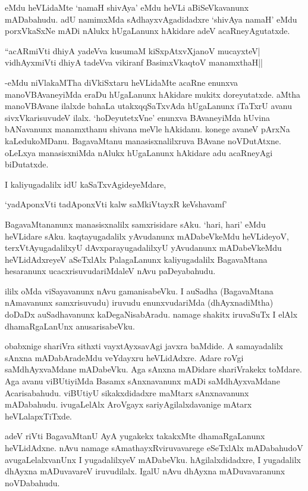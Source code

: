 eMdu heVLidaMte `namaH shivAya' eMdu heVLi aBiSeVkavanunx mADabahudu. adU namimxMda sAdhayxvAgadidadxre `shivAya namaH' eMdu porxVkaSxNe mADi nAlukx hUgaLanunx hAkidare adeV acaRneyAgutatxde.

\begin{shloka}
``acARmiVti dhiyA yadeVva kusumaM kiSxpAtxvXjanoV mucayxteV|\\
vidhAyxmiVti dhiyA tadeVva vikiranf BasimxVkaqtoV manamxthaH||
\end{shloka}

-eMdu niVlakaMTha diVkiSxtaru heVLidaMte acaRne enunxva manoVBAvaneyiMda eraDu hUgaLanunx hAkidare mukitx doreyutatxde. aMtha manoVBAvane ilalxde bahaLa utakxqqSaTxvAda hUgaLanunx iTaTxrU avanu sivxVkarisuvudeV ilalx. `hoDeyutetxVne' enunxva BAvaneyiMda hUvina bANavanunx manamxthanu shivana meVle hAkidanu. konege avaneV pArxNa kaLedukoMDanu. BagavaMtanu manasisxnalilxruva BAvane noVDutAtxne. oLeLxya manasisxniMda nAlukx hUgaLanunx hAkidare adu acaRneyAgi biDutatxde.

I kaliyugadalilx idU kaSaTxvAgideyeMdare,

\begin{shloka}
`yadAponxVti tadAponxVti kalw saMkiVtayxR keVshavamf'
\end{shloka}

BagavaMtananunx manasisxnalilx samxrisidare sAku. `hari, hari' eMdu heVLidare sAku. kaqtayugadalilx yAvudanunx mADabeVkeMdu heVLideyoV, terxVtAyugadalilxyU dAvxparayugadalilxyU yAvudanunx mADabeVkeMdu heVLidAdxreyeV aSeTxlAlx PalagaLanunx kaliyugadalilx BagavaMtana hesaranunx ucacxrisuvudariMdaleV nAvu paDeyabahudu.

ililx oMda viSayavanunx nAvu gamanisabeVku. I auSadha (BagavaMtana nAmavanunx samxrisuvudu) iruvudu enunxvudariMda (dhAyxnadiMtha) doDaDx auSadhavanunx kaDegaNisabAradu. namage shakitx iruvaSuTx I elAlx dhamaRgaLanUnx anusarisabeVku.

obabxnige shariVra sithxti vayxtAyxsavAgi javxra baMdide. A samayadalilx sAnxna mADabAradeMdu veYdayxru heVLidAdxre. Adare roVgi saMdhAyxvaMdane mADabeVku. Aga sAnxna mADidare shariVrakekx toMdare. Aga avanu viBUtiyiMda Basamx sAnxnavanunx mADi saMdhAyxvaMdane Acarisabahudu. viBUtiyU sikakxdidadxre maMtarx sAnxnavanunx mADabahudu. ivugaLelAlx AroVgayx sariyAgilalxdavanige mAtarx heVLalapxTiTxde.

adeV riVti BagavaMtanU AyA yugakekx takakxMte dhamaRgaLanunx heVLidAdxne. nAvu namage sAmathayxRviruvavarege eSeTxlAlx mADabahudoV avugaLelalxvanUnx I yugadalilxyeV mADabeVku. hAgilalxdidadxre, I yugadalilx dhAyxna mADuvavareV iruvudilalx. IgalU nAvu dhAyxna mADuvavaranunx noVDabahudu.

